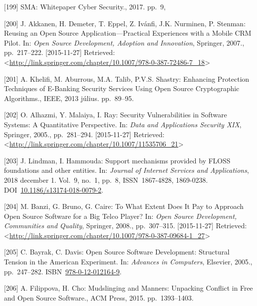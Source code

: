 \documentclass[12pt,magyar,a4paper,oneside]{scrreprt}
\newenvironment{cslreferences}%
  {}%
  {\par}
\begin{document}
\begin{cslreferences}
\leavevmode\hypertarget{ref-sma_whitepaper_2017}{}%
{[}199{]} SMA: Whitepaper Cyber Security., 2017. pp.~9,

\leavevmode\hypertarget{ref-akkanen_reusing_2007}{}%
{[}200{]} J. Akkanen, H. Demeter, T. Eppel, Z. Ivánfi, J.K. Nurminen, P.
Stenman: Reusing an Open Source Application---Practical Experiences with
a Mobile CRM Pilot. In: \emph{Open Source Development, Adoption and
Innovation}, Springer, 2007., pp.~217--222. {[}2015-11-27{]} Retrieved:
\textless{}\url{http://link.springer.com/chapter/10.1007/978-0-387-72486-7_18}\textgreater{}

\leavevmode\hypertarget{ref-khelifi_enhancing_2013}{}%
{[}201{]} A. Khelifi, M. Aburrous, M.A. Talib, P.V.S. Shastry: Enhancing
Protection Techniques of E-Banking Security Services Using Open Source
Cryptographic Algorithms., IEEE, 2013 július. pp.~89--95.

\leavevmode\hypertarget{ref-alhazmi_security_2005}{}%
{[}202{]} O. Alhazmi, Y. Malaiya, I. Ray: Security Vulnerabilities in
Software Systems: A Quantitative Perspective. In: \emph{Data and
Applications Security XIX}, Springer, 2005., pp.~281--294.
{[}2015-11-27{]} Retrieved:
\textless{}\url{http://link.springer.com/chapter/10.1007/11535706_21}\textgreater{}

\leavevmode\hypertarget{ref-lindman_support_2018}{}%
{[}203{]} J. Lindman, I. Hammouda: Support mechanisms provided by FLOSS
foundations and other entities. In: \emph{Journal of Internet Services
and Applications}, 2018 december 1. Vol.~9, no.~1, pp.~8,
ISSN~1867-4828, 1869-0238.
DOI~\href{https://doi.org/10.1186/s13174-018-0079-2}{10.1186/s13174-018-0079-2}.

\leavevmode\hypertarget{ref-banzi_what_2008}{}%
{[}204{]} M. Banzi, G. Bruno, G. Caire: To What Extent Does It Pay to
Approach Open Source Software for a Big Telco Player? In: \emph{Open
Source Development, Communities and Quality}, Springer, 2008.,
pp.~307--315. {[}2015-11-27{]} Retrieved:
\textless{}\url{http://link.springer.com/chapter/10.1007/978-0-387-09684-1_27}\textgreater{}

\leavevmode\hypertarget{ref-bayrak_open_2005}{}%
{[}205{]} C. Bayrak, C. Davis: Open Source Software Development:
Structural Tension in the American Experiment. In: \emph{Advances in
Computers}, Elsevier, 2005., pp.~247--282.
ISBN~\href{https://worldcat.org/isbn/978-0-12-012164-9}{978-0-12-012164-9}.

\leavevmode\hypertarget{ref-filippova_mudslinging_2015}{}%
{[}206{]} A. Filippova, H. Cho: Mudslinging and Manners: Unpacking
Conflict in Free and Open Source Software., ACM Press, 2015.
pp.~1393--1403.


\end{cslreferences}
\end{document}
